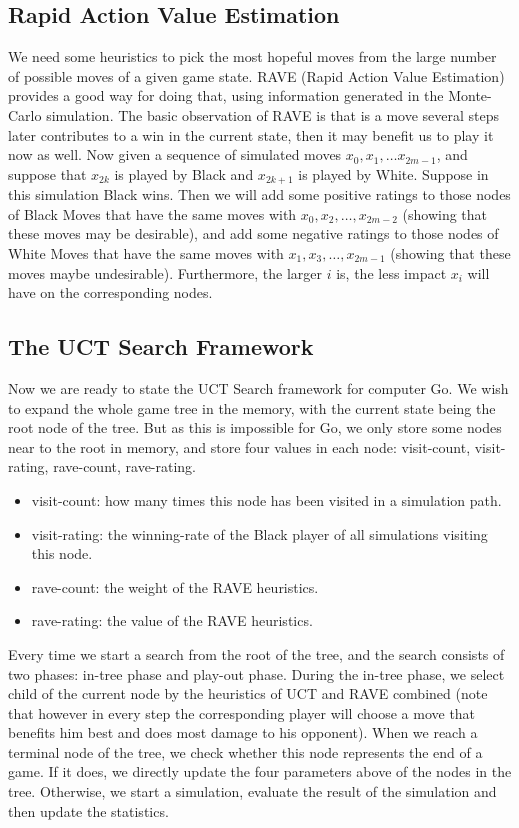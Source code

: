 \subsection{Rapid Action Value Estimation}
We need some heuristics to pick the most hopeful moves from the large number of possible moves of a given game state. RAVE (Rapid Action Value Estimation) \cite{gelly2011monte} provides a good way for doing that, using information generated in the Monte-Carlo simulation. The basic observation of RAVE is that is a move several steps later contributes to a win in the current state, then it may benefit us to play it now as well. Now given a sequence of simulated moves $x_0, x_1, \dots x_{2m-1}$, and suppose that $x_{2k}$ is played by Black and $x_{2k+1}$ is played by White. Suppose in this simulation Black wins. Then we will add some positive ratings to those nodes of Black Moves that have the same moves with $x_0, x_2, \dots, x_{2m-2}$ (showing that these moves may be desirable), and add some negative ratings to those nodes of White Moves that have the same moves with $x_1, x_3, \dots, x_{2m-1}$ (showing that these moves maybe undesirable). Furthermore, the larger $i$ is, the less impact $x_i$ will have on the corresponding nodes.


\subsection{The UCT Search Framework}
Now we are ready to state the UCT Search framework for computer Go. We wish to expand the whole game tree in the memory, with the current state being the root node of the tree. But as this is impossible for Go, we only store some nodes near to the root in memory, and store four values in each node: visit-count, visit-rating, rave-count, rave-rating.
\begin{itemize}
  \item visit-count: how many times this node has been visited in a simulation path.
  \item visit-rating: the winning-rate of the Black player of all simulations visiting this node.
  \item rave-count: the weight of the RAVE heuristics.
  \item rave-rating: the value of the RAVE heuristics.
\end{itemize}

Every time we start a search from the root of the tree, and the search consists of two phases: in-tree phase and play-out phase. During the in-tree phase, we select child of the current node by the heuristics of UCT and RAVE combined (note that however in every step the corresponding player will choose a move that benefits him best and does most damage to his opponent). When we reach a terminal node of the tree, we check whether this node represents the end of a game. If it does, we directly update the four parameters above of the nodes in the tree. Otherwise, we start a simulation, evaluate the result of the simulation and then update the statistics.

